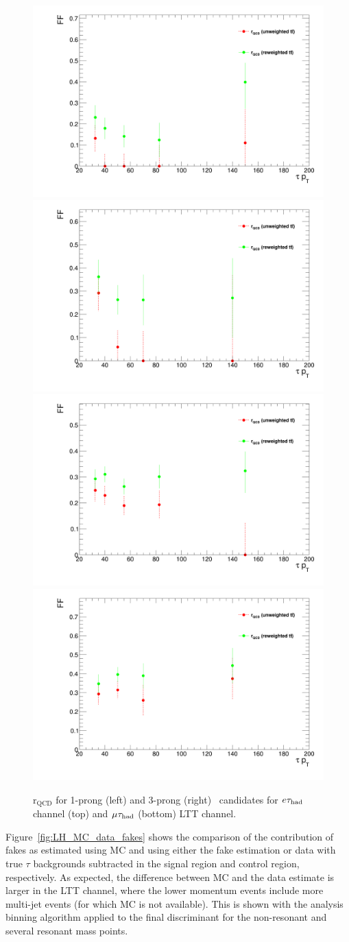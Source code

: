 \begin{figure}
\centering
\includegraphics[width=.4\textwidth]{DiHiggs/plots/FF_CRs/LTTElecrQCD1p.png}
\includegraphics[width=.4\textwidth]{DiHiggs/plots/FF_CRs/LTTElecrQCD3p.png} \\
\includegraphics[width=.4\textwidth]{DiHiggs/plots/FF_CRs/LTTMuonrQCD1p.png}
\includegraphics[width=.4\textwidth]{DiHiggs/plots/FF_CRs/LTTMuonrQCD3p.png}\\
\caption{$\mathrm{r}_{\mathrm{QCD}}$ for 1-prong (left) and 3-prong (right) \tauhad\ candidates for $e\tau_{\mathrm{had}}$ channel (top) and $\mu\tau_{\mathrm{had}}$ (bottom)
LTT channel.}
\label{fig:LTT_rQCD}
\end{figure}

Figure~\ref{fig:LH_MC_data_fakes} shows the comparison of the contribution of fakes as estimated using MC and using either the fake estimation or data with true $\tau$ backgrounds subtracted in the signal region and control region, respectively. As expected, the difference between MC and the data estimate is larger in the LTT channel, where the lower momentum events include more multi-jet events (for which MC is not available). This is shown with the analysis binning algorithm applied to the final discriminant for the non-resonant and several resonant mass points.

